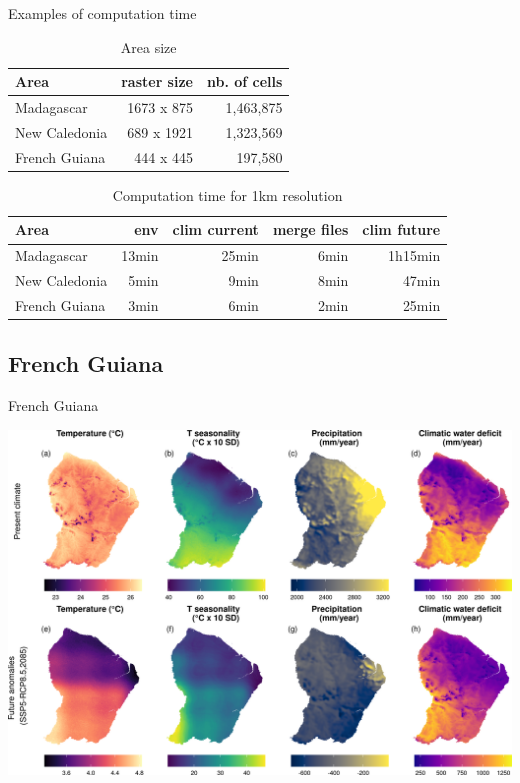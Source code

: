 \documentclass[10pt,table,dvipsnames,compress]{beamer}
\begin{document}
\begin{frame}[label={sec:org4d97673}]{Examples of computation time}
\begin{table}[htbp]
\caption{\label{tab:org1bbd18c}Area size}
\centering
\small
\begin{tabular}{lrr}
\toprule
Area & raster size & nb. of cells\\[0pt]
\midrule
Madagascar & 1673 x 875 & 1,463,875\\[0pt]
New Caledonia & 689 x 1921 & 1,323,569\\[0pt]
French Guiana & 444 x 445 & 197,580\\[0pt]
\bottomrule
\end{tabular}
\end{table}

\begin{table}[htbp]
\caption{\label{tab:org8b8fedd}Computation time for 1km resolution}
\centering
\small
\begin{tabular}{lrrrr}
\toprule
Area & env & clim current & merge files & clim future\\[0pt]
\midrule
Madagascar & 13min & 25min & 6min & 1h15min\\[0pt]
New Caledonia & 5min & 9min & 8min & 47min\\[0pt]
French Guiana & 3min & 6min & 2min & 25min\\[0pt]
\bottomrule
\end{tabular}
\end{table}
\end{frame}

\subsection{French Guiana}
\label{sec:org83e66b6}

\begin{frame}[label={sec:org6863a7f}]{French Guiana}
\begin{center}
\includegraphics[width=.9\linewidth]{figs/gecevar-guyane.png}
\end{center}
\end{frame}
\end{document}
